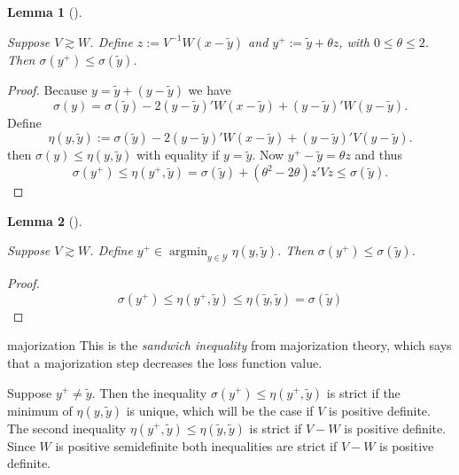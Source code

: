 \documentclass[
  12pt,
  letterpaper,
  DIV=11,
  numbers=noendperiod]{scrartcl}
\theoremstyle{plain}
\newtheorem{lemma}{Lemma}[section]
\theoremstyle{remark}
\begin{document}
\begin{lemma}[]\protect\hypertarget{lem-major1}{}\label{lem-major1}

Suppose \(V\gtrsim W\). Define \(z:=V^{-1}W(x-\tilde y)\) and
\(y^+:=\tilde y+\theta z\), with \(0\leq\theta\leq 2\). Then
\(\sigma(y^+)\leq\sigma(\tilde y)\).

\end{lemma}

\begin{proof}
Because \(y=\tilde y+(y-\tilde y)\) we have \begin{equation}
\sigma(y)=
\sigma(\tilde y)-2(y-\tilde y)'W(x-\tilde y)+(y-\tilde y)'W(y - \tilde y).
\end{equation} Define \begin{equation}
\eta(y,\tilde y):=
\sigma(\tilde y)-2(y-\tilde y)'W(x-\tilde y)+(y-\tilde y)'V(y - \tilde y).
\end{equation} then \(\sigma(y)\leq\eta(y,\tilde y)\) with equality if
\(y=\tilde y\). Now \(y^+-\tilde y=\theta z\) and thus \begin{equation}
\sigma(y^+)\leq\eta(y^+,\tilde y)=\sigma(\tilde y)+(\theta^2-2\theta)z'Vz\leq \sigma(\tilde y).
\end{equation}
\end{proof}

\begin{lemma}[]\protect\hypertarget{lem-major2}{}\label{lem-major2}

Suppose \(V\gtrsim W\). Define
\(y^+\in\mathop{\text{argmin}}_{y\in\mathcal{Y}}\eta(y,\tilde y)\). Then
\(\sigma(y^+)\leq\sigma(\tilde y)\).

\end{lemma}

\begin{proof}
\[
\sigma(y^+)\leq\eta(y^+,\tilde y)\leq\eta(\tilde y,\tilde y)=\sigma(\tilde y)
\]
\end{proof}

majorization This is the \emph{sandwich inequality} from majorization
theory, which says that a majorization step decreases the loss function
value.

Suppose \(y^+\neq\tilde y\). Then the inequality
\(\sigma(y^+)\leq\eta(y^+,\tilde y)\) is strict if the minimum of
\(\eta(y,\tilde y)\) is unique, which will be the case if \(V\) is
positive definite. The second inequality
\(\eta(y^+,\tilde y)\leq\eta(\tilde y,\tilde y)\) is strict if \(V-W\)
is positive definite. Since \(W\) is positive semidefinite both
inequalities are strict if \(V-W\) is positive definite.
\end{document}
